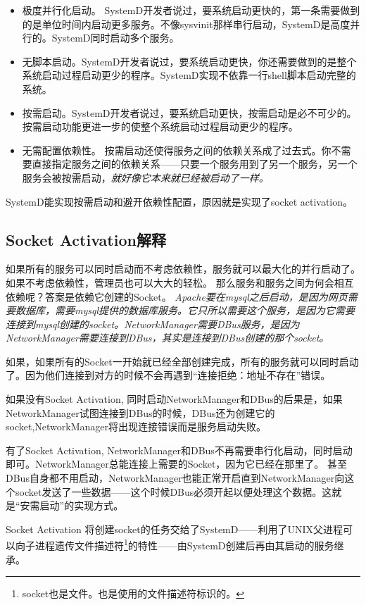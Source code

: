\documentclass[amstex,twoside]{ctexbook}
\newenvironment{insertnote}{ \ttfamily\CJKfamily{KaiTi} }{\vskip 0.5cm }
\begin{document}
\begin{itemize}
\item 极度并行化启动。
		SystemD开发者说过，要系统启动更快的，第一条需要做到的是单位时间内启动更多服务。不像sysvinit那样串行启动，SystemD是高度并行的。SystemD同时启动多个服务。

\item 无脚本启动。SystemD开发者说过，要系统启动更快，你还需要做到的是整个系统启动过程启动更少的程序。SystemD实现不依靠一行shell脚本启动完整的系统。

\item	按需启动。SystemD开发者说过，要系统启动更快，按需启动是必不可少的。按需启动功能更进一步的使整个系统启动过程启动更少的程序。

\item	无需配置依赖性。
		按需启动还使得服务之间的依赖关系成了过去式。你不需要直接指定服务之间的依赖关系——只要一个服务用到了另一个服务，另一个服务会被按需启动，\em 就好像它本来就已经被启动了一样。

\end{itemize}

SystemD能实现按需启动和避开依赖性配置，原因就是实现了socket activation。

\begin{insertnote}
\subsection*{Socket Activation解释}
如果所有的服务可以同时启动而不考虑依赖性，服务就可以最大化的并行启动了。如果不考虑依赖性，管理员也可以大大的轻松。
那么服务和服务之间为何会相互依赖呢？答案是依赖它创建的Socket。{ \it Apache要在mysql之后启动，是因为网页需要数据库，需要mysql提供的数据库服务。它只所以需要这个服务，是因为它需要连接到mysql创建的socket。NetworkManager需要DBus服务，是因为NetworkManager需要连接到DBus，其实是连接到DBus创建的那个socket。}

如果，如果所有的Socket一开始就已经全部创建完成，所有的服务就可以同时启动了。因为他们连接到对方的时候不会再遇到“连接拒绝：地址不存在”错误。

如果没有Socket Activation, 同时启动NetworkManager和DBus的后果是，如果NetworkManager试图连接到DBus的时候，DBus还为创建它的socket,NetworkManager将出现连接错误而是服务启动失败。

有了Socket Activation, NetworkManager和DBus不再需要串行化启动，同时启动即可。NetworkManager总能连接上需要的Socket，因为它已经在那里了。
甚至DBus自身都不用启动，NetworkManager也能正常开启直到NetworkManager向这个socket发送了一些数据——这个时候DBus必须开起以便处理这个数据。这就是“安需启动”的实现方式。

Socket Activation 将创建socket的任务交给了SystemD——利用了UNIX父进程可以向子进程遗传文件描述符\footnote{socket也是文件。也是使用的文件描述符标识的。}的特性——由SystemD创建后再由其启动的服务继承。
\end{insertnote}
\end{document}
